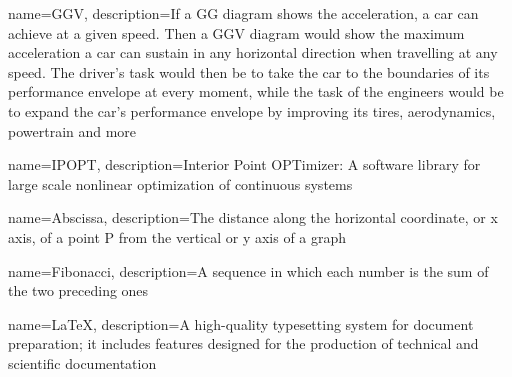 {
    name=GGV,
    description={If a GG diagram shows the acceleration, a car can achieve at a given speed. Then a GGV diagram would show the maximum acceleration a car can sustain in any horizontal direction when travelling at any speed. The driver's task would then be to take the car to the boundaries of its performance envelope at every moment, while the task of the engineers would be to expand the car's performance envelope by improving its tires, aerodynamics, powertrain and more \cite{the_performance_envelope_or_ggv_diagram}}
}

{
    name=IPOPT,
    description={Interior Point OPTimizer: A software library for large scale nonlinear optimization of continuous systems \cite{ipopt}}
}

{
    name=Abscissa,
    description={The distance along the horizontal coordinate, or x axis, of a point P from the vertical or y axis of a graph \cite{a_dictionary_of_epidemology}}
}

{
    name=Fibonacci,
    description={A sequence in which each number is the sum of the two preceding ones \cite{fibonacci}}
}

{
    name=LaTeX,
    description={A high-quality typesetting system for document preparation; it includes features designed for the production of technical and scientific documentation \cite{latex}}
}


